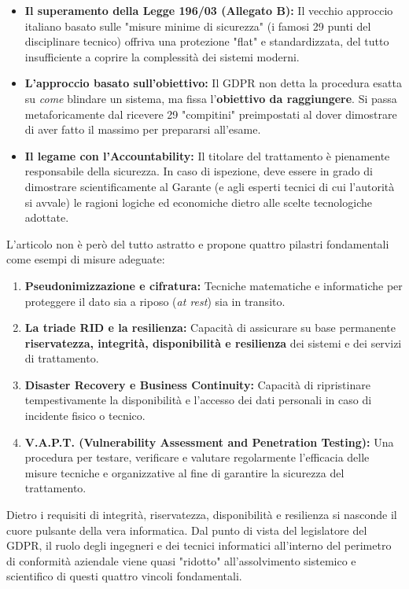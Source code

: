 \begin{itemize}
    \item \textbf{Il superamento della Legge 196/03 (Allegato B):} Il vecchio approccio italiano basato sulle "misure minime di sicurezza" (i famosi 29 punti del disciplinare tecnico) offriva una protezione "flat" e standardizzata, del tutto insufficiente a coprire la complessità dei sistemi moderni. 
    \item \textbf{L'approccio basato sull'obiettivo:} Il GDPR non detta la procedura esatta su \textit{come} blindare un sistema, ma fissa l'\textbf{obiettivo da raggiungere}. Si passa metaforicamente dal ricevere 29 "compitini" preimpostati al dover dimostrare di aver fatto il massimo per prepararsi all'esame.
    \item \textbf{Il legame con l'Accountability:} Il titolare del trattamento è pienamente responsabile della sicurezza. In caso di ispezione, deve essere in grado di dimostrare scientificamente al Garante (e agli esperti tecnici di cui l'autorità si avvale) le ragioni logiche ed economiche dietro alle scelte tecnologiche adottate.
\end{itemize}

L'articolo non è però del tutto astratto e propone quattro pilastri fondamentali come esempi di misure adeguate:

\begin{enumerate}[label=\alph*)]
    \item \textbf{Pseudonimizzazione e cifratura:} Tecniche matematiche e informatiche per proteggere il dato sia a riposo (\textit{at rest}) sia in transito.
    \item \textbf{La triade RID e la resilienza:} Capacità di assicurare su base permanente \textbf{riservatezza, integrità, disponibilità e resilienza} dei sistemi e dei servizi di trattamento.
    \item \textbf{Disaster Recovery e Business Continuity:} Capacità di ripristinare tempestivamente la disponibilità e l'accesso dei dati personali in caso di incidente fisico o tecnico.
    \item \textbf{V.A.P.T. (Vulnerability Assessment and Penetration Testing):} Una procedura per testare, verificare e valutare regolarmente l'efficacia delle misure tecniche e organizzative al fine di garantire la sicurezza del trattamento.
\end{enumerate}

Dietro i requisiti di integrità, riservatezza, disponibilità e resilienza si nasconde il cuore pulsante della vera informatica. Dal punto di vista del legislatore del GDPR, il ruolo degli ingegneri e dei tecnici informatici all'interno del perimetro di conformità aziendale viene quasi "ridotto" all'assolvimento sistemico e scientifico di questi quattro vincoli fondamentali.

